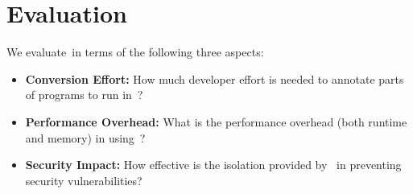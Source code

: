 \section{Evaluation}\label{sec:evaluation}

We evaluate~\systemname in terms of the following three aspects:
\begin{itemize}
\item\textbf{Conversion Effort:} How much developer effort is needed to annotate parts of programs to run in~\systemname?
\item\textbf{Performance Overhead:} What is the performance overhead (both runtime and memory) in using~\systemname?
\item\textbf{Security Impact:} How effective is the isolation provided by~\systemname{} in preventing security vulnerabilities?
\end{itemize}


